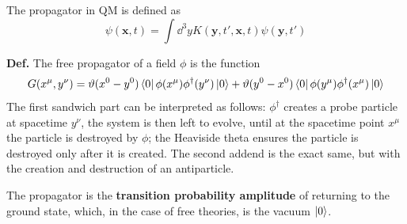 The propagator in QM is defined as
$$\psi(\mathbf{x},t) = \int \dd^3y K(\mathbf{y},t',\mathbf{x},t)\psi
(\mathbf{y},t')$$

\textbf{Def.} The free propagator of a field $\phi$ is the function
$$G(x^\mu,y^\nu) = \vartheta(x^0-y^0)\bra{0}\phi(x^\mu)\phi^\dagger(y^\nu)\ket{0}
+\vartheta(y^0-x^0) \bra{0}\phi(y^\mu)\phi^\dagger(x^\mu)\ket{0}$$
The first sandwich part can be interpreted as follows: $\phi^\dagger$ creates a
probe particle at spacetime $y^\nu$, the system is then left to evolve, until at
the spacetime point $x^\mu$ the particle is destroyed by $\phi$; the Heaviside
theta ensures the particle is destroyed only after it is created. The second
addend is the exact same, but with the creation and destruction of an
antiparticle.

The propagator is the \textbf{transition probability amplitude} of returning to
the ground state, which, in the case of free theories, is the vacuum $\ket{0}$.

